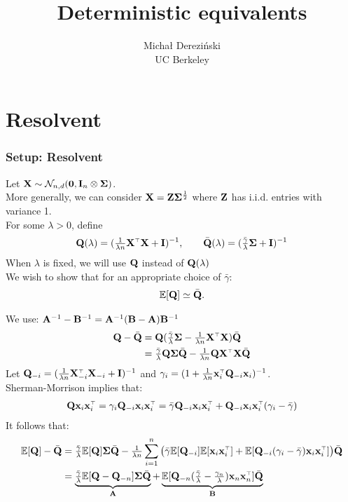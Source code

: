 \documentclass[10pt]{beamer}
\title[]{Deterministic equivalents}
\author[]{Micha{\l} Derezi\'{n}ski\\
UC Berkeley}
\begin{document}
\begin{frame}
  \titlepage
\end{frame}

\linespread{1.3}

\section{Resolvent}

\begin{frame}
  \frametitle{Setup: Resolvent}
  Let $\mathbf X\sim \mathcal{N}_{n,d}(\mathbf 0,\mathbf I_n\otimes\mathbf{\Sigma})$.\\
  More generally, we can consider $\mathbf X = \mathbf Z\mathbf{\Sigma}^{\frac12}$ where
  $\mathbf Z$ has i.i.d. entries with variance 1.\\[5mm]

 For some $\lambda>0$, define
  \begin{align*}
    \Q(\lambda) = (\tfrac1{\lambda n}\X^\top\X+\I)^{-1},\qquad \Qbar(\lambda) =
    (\tfrac{\bar\gamma}{\lambda}\Sigmab + \I)^{-1}
  \end{align*}
When $\lambda$ is fixed, we will use $\mathbf Q$ instead of $\mathbf Q(\lambda)$\\
  We wish to show that for an appropriate choice of $\bar\gamma$:
  \begin{align*}
    \mathbb E[\mathbf Q] \simeq {\bar{\mathbf Q}}.
    \end{align*}
  \end{frame}

  \begin{frame}
    We use: $\mathbf A^{-1}-\mathbf B^{-1} = \mathbf A^{-1}(\mathbf B-\mathbf A)\mathbf B^{-1}$
    \begin{align*}
      \Q-\Qbar &=
                 \Q(\tfrac{\bar\gamma}{\lambda}\Sigmab-
                 \tfrac1{\lambda n}\X^\top\X)\Qbar\\
      &=\tfrac{\bar\gamma}{\lambda}\Q\Sigmab\Qbar - \tfrac1{\lambda n}\Q\X^\top\X\Qbar
    \end{align*}
    Let  $\Q_{-i} =
  (\tfrac1{\lambda n}\X_{-i}^\top\X_{-i}+\I)^{-1}$ and
  $\gamma_i=(1+\frac1{\lambda n}\x_i^\top\Q_{-i}\x_i)^{-1}$.\\
  Sherman-Morrison implies that:
  \begin{align*}
    \Q\x_i\x_i^\top=\gamma_i\Q_{-i}\x_i\x_i^\top =
    \bar\gamma\Q_{-i}\x_i\x_i^\top + \Q_{-i}\x_i\x_i^\top(\gamma_i-\bar\gamma)
  \end{align*}
It follows that:
  \begin{align*}
    \E[\Q]-\Qbar &= \tfrac{\bar\gamma}{\lambda} \E[\Q]\Sigmab\bar\Q -
    \tfrac1{\lambda n}\sum_{i=1}^n\big(\bar\gamma\E[\Q_{-i}]\E[\x_i\x_i^\top] +
    \E[\Q_{-i}(\gamma_i-\bar\gamma)\x_i\x_i^\top]\big)\bar\Q \\
    &=\underbrace{\tfrac{\bar\gamma}{\lambda}\E[\Q-\Q_{-n}]\Sigmab\bar\Q}_{\A} +
\underbrace{\E[\Q_{-n}(\tfrac{\bar\gamma}{\lambda}-\tfrac{\gamma_n}{\lambda})\x_n\x_n^\top]\bar\Q}_{\B}
  \end{align*}
\end{frame}
\end{document}
